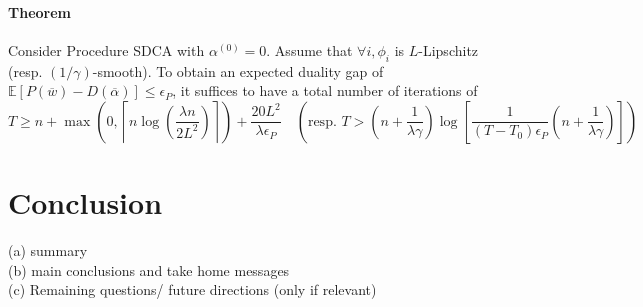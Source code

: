 \documentclass{article}
\begin{document}
\paragraph{Theorem} Consider Procedure SDCA with $\alpha^{(0)} = 0$.
Assume that $\forall i, \phi_i$ is $L$-Lipschitz (resp.
$(1/\gamma)$-smooth).
To obtain an expected duality gap of $\mathbb{E}[P(\overline{w})-D(\overline{\alpha})] \leq \epsilon_P$, it suffices to have a total number of iterations of
$$T \geq n + \max\left(0, \left\lceil n \log \left(\dfrac{\lambda n}{2 L^2} \right) \right\rceil \right) + \dfrac{20 L^2}{\lambda \epsilon_P} \quad \left( \text{resp. } T > \left(n + \dfrac{1}{\lambda \gamma} \right) \log \left[ \dfrac{1}{(T-T_0)\epsilon_P} \left(n + \dfrac{1}{\lambda \gamma} \right) \right] \right)$$ 


\newpage

\section{Conclusion}
(a) summary \\
(b) main conclusions and take home messages \\
(c) Remaining questions/ future directions (only if relevant) \\
\end{document}
